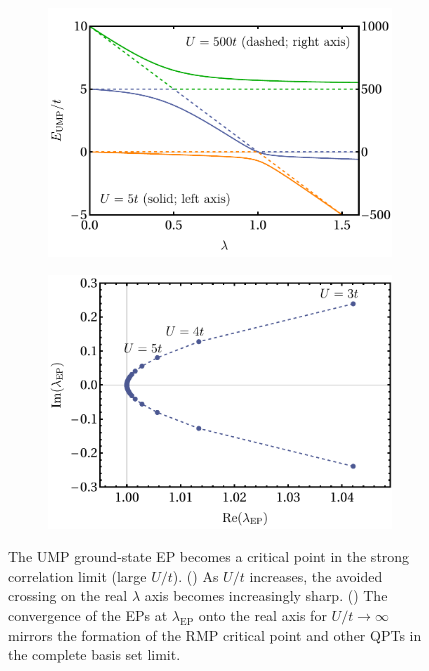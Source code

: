 \documentclass[aps,prb,reprint,noshowkeys,superscriptaddress]{revtex4-1}
\newcommand{\lep}{\lambda_{\text{EP}}}
\begin{document}
\begin{figure}[t]
\begin{subfigure}{0.49\textwidth}
    \includegraphics[height=0.65\textwidth,trim={0pt 5pt 0pt 15pt}, clip]{ump_critical_point}
\subcaption{\label{subfig:ump_cp}}
\end{subfigure}
\begin{subfigure}{0.49\textwidth}
\includegraphics[height=0.65\textwidth]{ump_ep_to_cp}
\subcaption{\label{subfig:ump_ep_to_cp}}
\end{subfigure}
\caption{%
    The UMP ground-state EP becomes a critical point in the strong correlation limit (large $U/t$).
    () As $U/t$ increases, the avoided crossing on the real $\lambda$ axis
    becomes increasingly sharp.
    () The convergence of the EPs at $\lep$ onto the real axis for $U/t \to \infty$
    mirrors the formation of the RMP critical point and other QPTs in the complete basis set limit.
\label{fig:UMP_cp}}

\end{figure}
\end{document}
